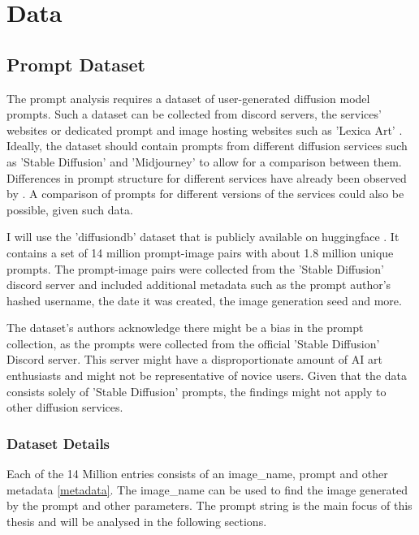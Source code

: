 \chapter{Data}
\label{cha:Data}

\section{Prompt Dataset}

The prompt analysis requires a dataset of user-generated diffusion model prompts. Such a dataset can be collected from discord servers, the services' websites or dedicated prompt and image hosting websites such as 'Lexica Art' \autocite{lexica}. Ideally, the dataset should contain prompts from different diffusion services such as 'Stable Diffusion' and 'Midjourney' to allow for a comparison between them. Differences in prompt structure for different services have already been observed by \autocite{poloclub-diffusiondb}.
A comparison of prompts for different versions of the services could also be possible, given such data.

I will use the 'diffusiondb' dataset that is publicly available on huggingface \autocite{poloclub-diffusiondb}. It contains a set of 14 million prompt-image pairs with about 1.8 million unique prompts. The prompt-image pairs were collected from the 'Stable Diffusion' discord server and included additional metadata such as the prompt author's hashed username, the date it was created, the image generation seed and more.

The dataset's authors \autocite{poloclub-diffusiondb} acknowledge there might be a bias in the prompt collection, as the prompts were collected from the official 'Stable Diffusion' Discord server. This server might have a disproportionate amount of AI art enthusiasts and might not be representative of novice users.
Given that the data consists solely of 'Stable Diffusion' prompts, the findings might not apply to other diffusion services.



\subsection{Dataset Details}

Each of the 14 Million entries consists of an image\_name, prompt and other metadata \ref{metadata}. The image\_name can be used to find the image generated by the prompt and other parameters. The prompt string is the main focus of this thesis and will be analysed in the following sections.

